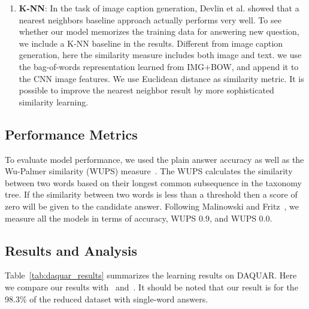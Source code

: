 \documentclass{article} %
\renewcommand{\#}[1]{\textbf{#1}}
\begin{document}
\begin{enumerate}[leftmargin=*]
\item \#{K-NN}: In the task of image caption generation, Devlin et al.
\cite{devlin15} showed that a nearest neighbors baseline approach actually
performs very well. To see whether our model memorizes the training data for
answering new question, we include a K-NN baseline in the results. Different
from image caption generation, here the similarity measure includes both image
and text.  we use the bag-of-words representation learned from IMG+BOW, and
append it to the CNN image features.  We use Euclidean distance as similarity
metric. It is possible to improve the nearest neighbor result by more
sophisticated similarity learning.

\end{enumerate}


\subsection{Performance Metrics}

To evaluate model performance, we used the plain answer accuracy as well as the
Wu-Palmer similarity (WUPS) measure~\cite{wu94, malinowski14b}. The WUPS
calculates the similarity between two words based on their longest common
subsequence in the taxonomy tree. If the similarity between two words is less
than a threshold then a score of zero will be given to the candidate answer.
Following Malinowski and Fritz~\cite{malinowski14b}, we measure all the models
in terms of accuracy, WUPS 0.9, and WUPS 0.0.

\subsection{Results and Analysis}

Table~\ref{tab:daquar_results} summarizes the learning results on DAQUAR. Here
we compare our results with~\cite{malinowski14b} and~\cite{malinowski15}. It
should be noted that our result is for the 98.3\% of the reduced dataset with
single-word answers.
\end{document}
